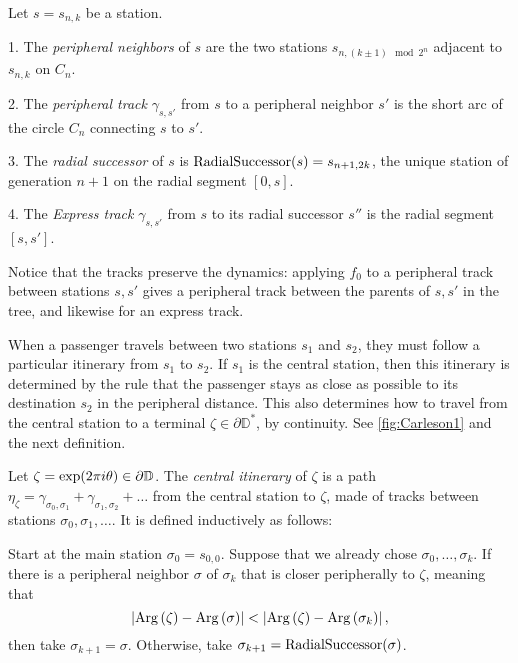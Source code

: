 \begin{definition}
Let $s=s_{n,k}$ be a station.

1. The \emph{peripheral neighbors} of $s$ are the two stations $s_{n,\left(k\pm1\right)\mod 2^{n}}$ adjacent to $s_{n,k}$ on $C_{n}$.

2. The \emph{peripheral track }$\gamma_{s,s'}$ from $s$ to a peripheral neighbor $s'$
is the short arc of the circle $C_{n}$ connecting $s$ to $s'$.

3. The \emph{radial successor} of $s$ is $\operatorname{RadialSuccessor}(s)=s_{n+1,2k}$, the unique station of generation $n+1$ on the radial segment $[0,s]$.

4. The \emph{Express track} $\gamma_{s,s'}$ from $s$ to its radial successor $s''$ is the radial segment $[s,s']$.

\end{definition}

Notice that the tracks preserve the dynamics: applying $f_0$ to a peripheral track between stations $s,s'$ gives a peripheral track between the parents of $s,s'$ in the tree, and likewise for an express track.

When a passenger travels between two stations $s_1$ and $s_2$, they must follow a particular itinerary from $s_1$ to $s_2$.
If $s_1$ is the central station, then this itinerary is determined by the rule that the passenger stays as close as possible to its destination $s_2$ in the peripheral distance. 
This also determines how to travel from the central station to a terminal $\zeta\in \partial \mathbb D^*$, by continuity. See \cref{fig:Carleson1} and the next definition.


\begin{definition}
Let $\zeta=\exp(2\pi i\theta)\in\partial\mathbb{D}$. The \emph{central itinerary} of $\zeta$ is a path $\eta_\zeta = \gamma _{\sigma_0,\sigma_1} + \gamma_{\sigma_1,\sigma_2}+\ldots$ from the central station to $\zeta$, made of tracks between stations $\sigma_0,\sigma_1,\ldots$. It is defined inductively as follows:

Start at the main station $\sigma_0=s_{0,0}$. Suppose that we already chose $\sigma_0,\ldots,\sigma_k$. If there is a peripheral neighbor $\sigma$ of $\sigma_k$ that is closer peripherally to $\zeta$, meaning that $$\left|\operatorname{Arg}\left(\zeta\right)-\operatorname{Arg}\left(\sigma\right)\right|
< \left|\operatorname{Arg}\left(\zeta\right)-\operatorname{Arg}\left(\sigma_{k}\right)\right|,$$ then take $\sigma_{k+1}=\sigma$. Otherwise, take 
$\sigma_{k+1}=\operatorname{RadialSuccessor}(\sigma)$.
\end{definition}

